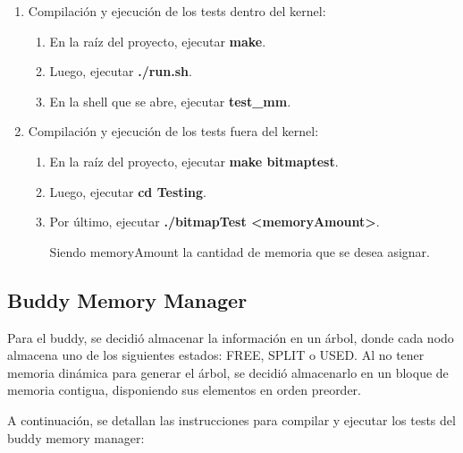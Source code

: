 \documentclass{article}
\begin{document}
\begin{enumerate}

\item Compilación y ejecución de los tests dentro del kernel:

\begin{enumerate}
    \item En la raíz del proyecto, ejecutar \textbf{make}.
    \item Luego, ejecutar \textbf{./run.sh}.
    \item En la shell que se abre, ejecutar \textbf{test\_mm}.
\end{enumerate}

\item Compilación y ejecución de los tests fuera del kernel:

\begin{enumerate}
    \item En la raíz del proyecto, ejecutar \textbf{make bitmaptest}.
    \item Luego, ejecutar \textbf{cd Testing}.
    \item Por último, ejecutar \textbf{./bitmapTest \textless memoryAmount\textgreater}. 

    Siendo memoryAmount la cantidad de memoria que se desea asignar.
\end{enumerate}

\end{enumerate}

\subsection {Buddy Memory Manager}

Para el buddy, se decidió almacenar la información en un árbol, donde cada nodo almacena uno de los siguientes estados: FREE, SPLIT o USED. Al no tener memoria dinámica para generar el árbol, se decidió almacenarlo en un bloque de memoria contigua, disponiendo sus elementos en orden preorder.

A continuación, se detallan las instrucciones para compilar y ejecutar los tests del buddy memory manager:
\end{document}

